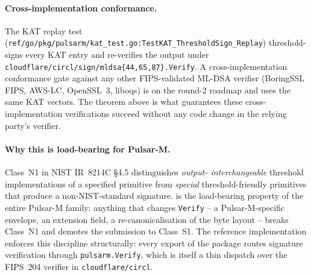 \paragraph{Cross-implementation conformance.}
The KAT replay test
(\texttt{ref/go/pkg/pulsarm/kat\_test.go:TestKAT\_ThresholdSign\_Replay})
threshold-signs every KAT entry and re-verifies the output under
\texttt{cloudflare/circl/sign/mldsa\{44,65,87\}.Verify}. A
cross-implementation conformance gate against any other
FIPS-validated ML-DSA verifier (BoringSSL FIPS, AWS-LC, OpenSSL~3,
liboqs) is on the round-2 roadmap and uses the same KAT vectors.
The theorem above is what guarantees these cross-implementation
verifications succeed without any code change in the relying
party's verifier.

\paragraph{Why this is load-bearing for Pulsar-M.}
Class~N1 in NIST IR~8214C \S4.5 distinguishes \emph{output-
interchangeable} threshold implementations of a specified primitive
from \emph{special} threshold-friendly primitives that produce a
non-NIST-standard signature. 
is the load-bearing property of the entire Pulsar-M family: anything
that changes \texttt{Verify} -- a Pulsar-M-specific envelope, an
extension field, a re-canonicalisation of the byte layout -- breaks
Class~N1 and demotes the submission to Class~S1. The reference
implementation enforces this discipline structurally: every export
of the package routes signature verification through
\texttt{pulsarm.Verify}, which is itself a thin dispatch over the
FIPS~204 verifier in \texttt{cloudflare/circl}.

